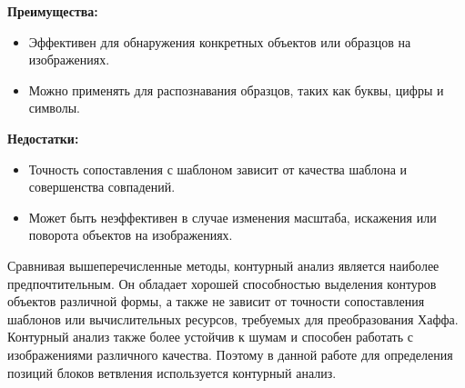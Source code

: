 \documentclass[12pt]{report}
\begin{document}
\textbf{Преимущества:}
\begin{itemize}
    \item Эффективен для обнаружения конкретных объектов или образцов на изображениях.
    \item Можно применять для распознавания образцов, таких как буквы, цифры и символы.
\end{itemize}

\textbf{Недостатки:}
\begin{itemize}
    \item Точность сопоставления с шаблоном зависит от качества шаблона и совершенства совпадений.
    \item Может быть неэффективен в случае изменения масштаба, искажения или поворота объектов на изображениях.
\end{itemize}

Сравнивая вышеперечисленные методы, контурный анализ является наиболее предпочтительным. 
Он обладает хорошей способностью выделения контуров объектов различной формы, а также не зависит от точности сопоставления шаблонов или вычислительных ресурсов, требуемых для преобразования Хаффа. 
Контурный анализ также более устойчив к шумам и способен работать с изображениями различного качества.
Поэтому в данной работе для определения позиций блоков ветвления используется контурный анализ.
\end{document}
